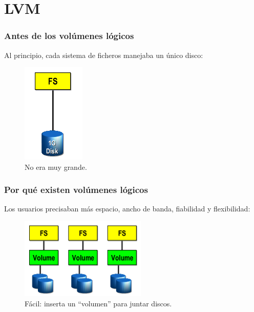 \documentclass{beamer}
\begin{document}

\section{LVM}


\begin{frame}
  \frametitle{Antes de los volúmenes lógicos}
Al principio, cada sistema de ficheros manejaba un único disco:

\begin{figure}[h]
\begin{center}
  \includegraphics[width=3cm]{figs/singledisk.png}
  \caption{{\footnotesize No era muy grande.}}
\end{center}
\end{figure}

\end{frame}


\begin{frame}
  \frametitle{Por qué existen volúmenes lógicos}
Los usuarios precisaban más espacio, ancho de banda, fiabilidad y flexibilidad:

\begin{figure}[h]
\begin{center}
  \includegraphics[width=6cm]{figs/volumes.png}
  \caption{{\footnotesize Fácil: inserta un ``volumen'' para juntar discos.}}
\end{center}
\end{figure}

\end{frame}
\end{document}
